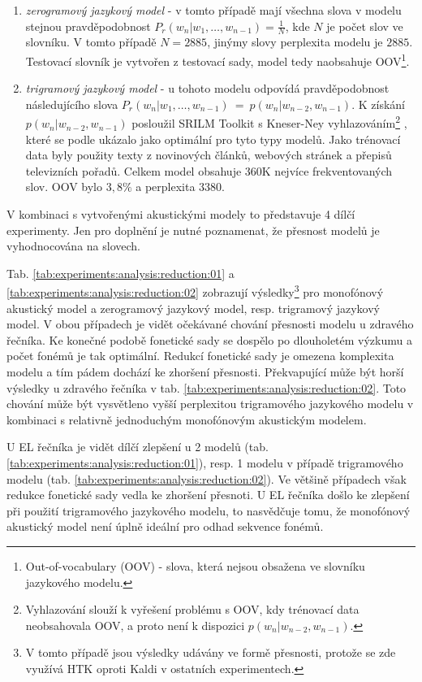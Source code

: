 \begin{enumerate}
  \item \textit{zerogramový jazykový model} - v tomto případě mají všechna slova v modelu stejnou pravděpodobnost $P_r(w_n|w_1,\dots,w_{n-1}) = \frac{1}{N}$, kde $N$ je počet slov ve slovníku. V tomto případě $N = 2885$, jinýmy slovy perplexita modelu je $2885$. Testovací slovník je vytvořen z testovací sady, model tedy naobsahuje OOV\footnote{Out-of-vocabulary (OOV) - slova, která nejsou obsažena ve slovníku jazykového modelu.}.
  \item \textit{trigramový jazykový model} - u tohoto modelu odpovídá pravděpodobnost následujícího slova $P_r(w_n|w_1,\dots,w_{n-1})~=~p(w_n|w_{n-2}, w_{n-1})$. K získání $p(w_n|w_{n-2}, w_{n-1})$ posloužil SRILM Toolkit s Kneser-Ney vyhlazováním\footnote{Vyhlazování slouží k vyřešení problému s OOV, kdy trénovací data neobsahovala OOV, a proto není k dispozici $p(w_n|w_{n-2}, w_{n-1})$.} \cite{Stolcke2002}, které se podle \cite{Prazak2008} ukázalo jako optimální pro tyto typy modelů. Jako trénovací data byly použity texty z novinových článků, webových stránek a přepisů televizních pořadů. Celkem model obsahuje 360K nejvíce frekventovaných slov. OOV bylo $3,8 \%$ a perplexita $3380$.
\end{enumerate}

\noindent V kombinaci s vytvořenými akustickými modely to představuje 4 dílčí experimenty. Jen pro doplnění je nutné poznamenat, že přesnost modelů je vyhodnocována na slovech.

Tab. \ref{tab:experiments:analysis:reduction:01} a \ref{tab:experiments:analysis:reduction:02} zobrazují výsledky\footnote{V tomto případě jsou výsledky udávány ve formě přesnosti, protože se zde využívá HTK oproti Kaldi v ostatních experimentech.} pro monofónový akustický model a zerogramový jazykový model, resp. trigramový jazykový model. V obou případech je vidět očekávané chování přesnosti modelu u zdravého řečníka. Ke konečné podobě fonetické sady se dospělo po dlouholetém výzkumu a počet fonémů je tak optimální. Redukcí fonetické sady je omezena komplexita modelu a tím pádem dochází ke zhoršení přesnosti. Překvapující může být horší výsledky u zdravého řečníka v tab. \ref{tab:experiments:analysis:reduction:02}. Toto chování může být vysvětleno vyšší perplexitou trigramového jazykového modelu v kombinaci s relativně jednoduchým monofónovým akustickým modelem.

U EL řečníka je vidět dílčí zlepšení u 2 modelů (tab. \ref{tab:experiments:analysis:reduction:01}), resp. 1 modelu v případě trigramového modelu (tab. \ref{tab:experiments:analysis:reduction:02}). Ve většině případech však redukce fonetické sady vedla ke zhoršení přesnoti. U EL řečníka došlo ke zlepšení při použití trigramového jazykového modelu, to nasvědčuje tomu, že monofónový akustický model není úplně ideální pro odhad sekvence fonémů.

